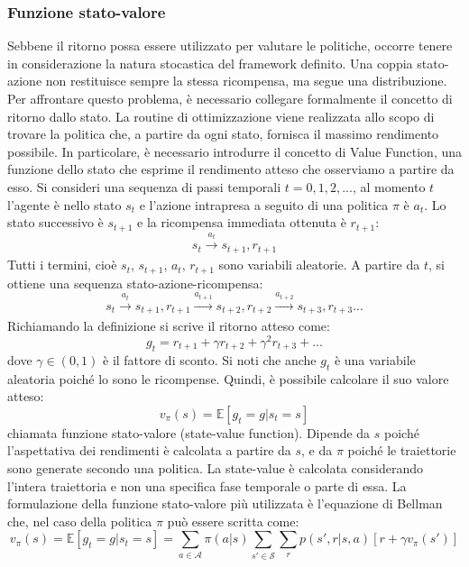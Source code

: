 \subsubsection{Funzione stato-valore}
Sebbene il ritorno possa essere utilizzato per valutare le politiche, occorre tenere in considerazione la natura stocastica del framework definito. Una coppia stato-azione non restituisce sempre la stessa ricompensa, ma segue una distribuzione. Per affrontare questo problema, è necessario collegare formalmente il concetto di ritorno dallo stato. La routine di ottimizzazione viene realizzata allo scopo di trovare la politica che, a partire da ogni stato, fornisca il massimo rendimento possibile. In particolare, è necessario introdurre il concetto di Value Function, una funzione dello stato che esprime il rendimento atteso che osserviamo a partire da esso. Si consideri una sequenza di passi temporali $t=0,1,2,...$, al momento $t$ l'agente è nello stato $s_t$ e l'azione intrapresa a seguito di una politica $\pi$ è $a_t$. Lo stato successivo è $s_{t+1}$ e la ricompensa immediata ottenuta è $r_{t+1}$:
\begin{equation}s_t\xrightarrow[]{a_t} s_{t+1},r_{t+1}\end{equation}
Tutti i termini, cioè $s_t$, $s_{t+1}$, $a_t$, $r_{t+1}$ sono variabili aleatorie. A partire da $t$, si ottiene una sequenza stato-azione-ricompensa:
\begin{equation}s_t\xrightarrow[]{a_t} s_{t+1},r_{t+1} \xrightarrow[]{a_{t+1}} s_{t+2},r_{t+2}\xrightarrow[]{a_{t+2}} s_{t+3},r_{t+3}...\end{equation}
Richiamando la definizione si scrive il ritorno atteso come:
\begin{equation}g_t=r_{t+1}+\gamma r_{t+2}+\gamma^2 r_{t+3}+...\end{equation}
dove $\gamma \in (0,1)$ è il fattore di sconto. Si noti che anche $g_t$ è una variabile aleatoria poiché lo sono le ricompense. Quindi, è possibile calcolare il suo valore atteso:
\begin{equation}v_\pi (s)= \mathbb{E}[g_t=g|s_t=s]\end{equation}
chiamata funzione stato-valore (state-value function). Dipende da $s$ poiché l'aspettativa dei rendimenti è calcolata a partire da $s$, e da $\pi$ poiché le traiettorie sono generate secondo una politica. La state-value è calcolata considerando l'intera traiettoria e non una specifica fase temporale o parte di essa. La formulazione della funzione stato-valore più utilizzata è l'equazione di Bellman che, nel caso della politica $\pi$ può essere scritta come:
\begin{equation}v_\pi (s)= \mathbb{E}[g_t=g|s_t=s]=\sum_{a \in \mathcal{A}}\pi(a|s)\sum_{s'\in \mathcal{S}}\sum_r p(s',r|s,a)[r+\gamma v_\pi(s')]\end{equation}


